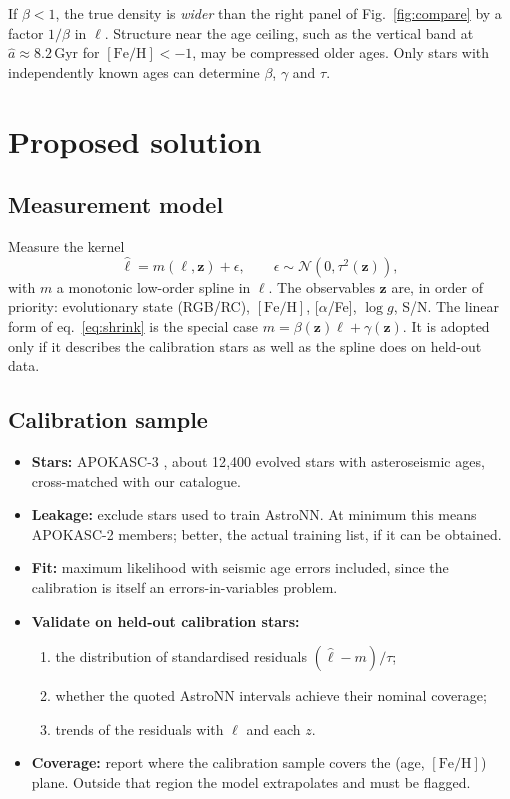 \documentclass[11pt,a4paper]{article}
\newcommand{\feh}{\ensuremath{[\mathrm{Fe/H}]}}
\newcommand{\N}{\ensuremath{\mathcal{N}}}
\begin{document}
If $\beta<1$, the true density is \emph{wider} than the right panel of Fig.~\ref{fig:compare} by a factor $1/\beta$ in $\ell$. Structure near the age ceiling, such as the vertical band at $\hat a\approx8.2$\,Gyr for $\feh<-1$, may be compressed older ages. Only stars with independently known ages can determine $\beta$, $\gamma$ and $\tau$.

\section{Proposed solution}

\subsection{Measurement model}
Measure the kernel
\begin{equation}
\hat\ell=m(\ell,\bm z)+\epsilon,\qquad \epsilon\sim\N\!\left(0,\tau^2(\bm z)\right),
\label{eq:kernel}
\end{equation}
with $m$ a monotonic low-order spline in $\ell$. The observables $\bm z$ are, in order of priority: evolutionary state (RGB/RC), \feh, [$\alpha$/Fe], $\log g$, S/N. The linear form of eq.~\eqref{eq:shrink} is the special case $m=\beta(\bm z)\ell+\gamma(\bm z)$. It is adopted only if it describes the calibration stars as well as the spline does on held-out data.

\subsection{Calibration sample}
\begin{itemize}
  \item \textbf{Stars:} APOKASC-3 \citep{Pinsonneault2025}, about 12{,}400 evolved stars with asteroseismic ages, cross-matched with our catalogue.
  \item \textbf{Leakage:} exclude stars used to train AstroNN. At minimum this means APOKASC-2 \citep{Pinsonneault2018} members; better, the actual training list, if it can be obtained.
  \item \textbf{Fit:} maximum likelihood with seismic age errors included, since the calibration is itself an errors-in-variables problem.
  \item \textbf{Validate on held-out calibration stars:}
    \begin{enumerate}
      \item the distribution of standardised residuals $(\hat\ell-m)/\tau$;
      \item whether the quoted AstroNN intervals achieve their nominal coverage;
      \item trends of the residuals with $\ell$ and each $z$.
    \end{enumerate}
  \item \textbf{Coverage:} report where the calibration sample covers the (age, \feh) plane. Outside that region the model extrapolates and must be flagged.
\end{itemize}
\end{document}
